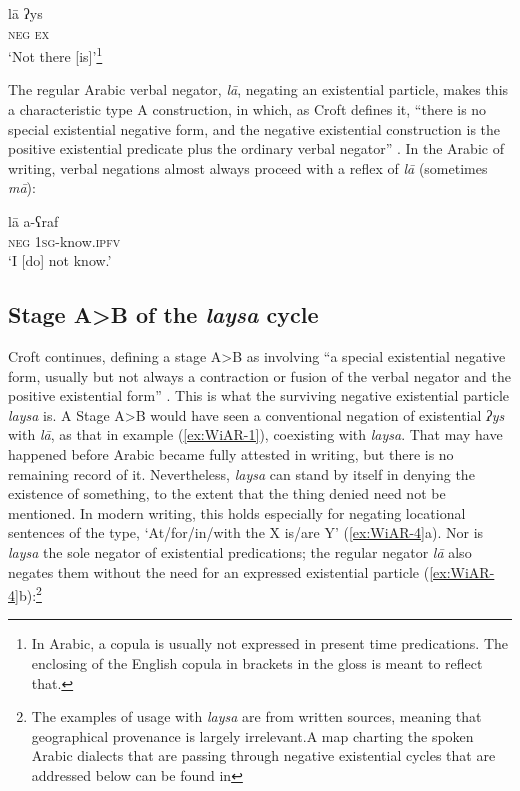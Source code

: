 \documentclass[output=paper]{langsci/langscibook}
\begin{document}
\ea \label{ex:WiAR-2}
	\gll lā ʔys\\
	\textsc{neg} \textsc{ex}\\
	\glt `Not there [is]’\footnote{In Arabic, a copula is usually not expressed in present time predications. The enclosing of the English copula in brackets in the gloss is meant to reflect that. } \citep[105]{al-far2003a}
\z

The regular Arabic verbal negator, \textit{lā}, negating an existential particle, makes this a characteristic type A construction, in which, as Croft defines it, “there is no special existential negative form, and the negative existential construction is the positive existential predicate plus the ordinary verbal negator” \citeyearpar[6-7]{Croft1991}. In the Arabic of writing, verbal negations almost always proceed with a reflex of \textit{lā} (sometimes \textit{mā}):

\ea \label{ex:WiAR-3}
	\gll lā a-ʕraf \\
	\textsc{neg} \textsc{1sg}-know.\textsc{ipfv} \\
	\glt ‘I [do] not know.’ \citep[144, 158]{adwan2000a}
\z

\subsection{Stage A>B of the \textit{laysa} cycle} \label{s:WiAR-2.1}

Croft continues, defining a stage A>B as involving “a special existential negative form, usually but not always a contraction or fusion of the verbal negator and the positive existential form” \citeyearpar[7]{Croft1991}. This is what the surviving negative existential particle \textit{laysa} is. A Stage A>B would have seen a conventional negation of existential \textit{ʔys} with \textit{lā}, as that in example (\ref{ex:WiAR-1}), coexisting with \textit{laysa}. That may have happened before Arabic became fully attested in writing, but there is no remaining record of it. Nevertheless, \textit{laysa} can stand by itself in denying the existence of something, to the extent that the thing denied need not be mentioned. In modern writing, this holds especially for negating locational sentences of the type, ‘At/for/in/with the X is/are Y’ (\ref{ex:WiAR-4}a). Nor is \textit{laysa} the sole negator of existential predications; the regular negator \textit{lā} also negates them without the need for an expressed existential particle (\ref{ex:WiAR-4}b):\footnote{The examples of usage with \textit{laysa} are from written sources, meaning that geographical provenance is largely irrelevant.A map charting the spoken Arabic dialects that are passing through negative existential cycles that are addressed below can be found in }
\end{document}
